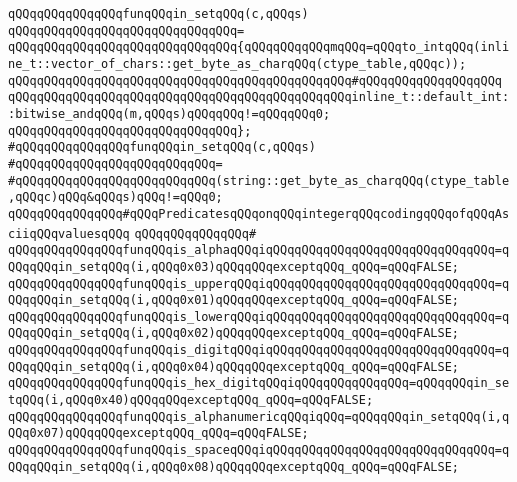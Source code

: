 \newline
\verb|qQQqqQQqqQQqqQQqfunqQQqin_setqQQq(c,qQQqs)|\newline
\verb|qQQqqQQqqQQqqQQqqQQqqQQqqQQqqQQq=|\newline
\verb|qQQqqQQqqQQqqQQqqQQqqQQqqQQqqQQq{qQQqqQQqqQQqmqQQq=qQQqto_intqQQq(inline_t::vector_of_chars::get_byte_as_charqQQq(ctype_table,qQQqc));|\newline
\verb|qQQqqQQqqQQqqQQqqQQqqQQqqQQqqQQqqQQqqQQqqQQqqQQq#qQQqqQQqqQQqqQQqqQQq|\newline
\verb|qQQqqQQqqQQqqQQqqQQqqQQqqQQqqQQqqQQqqQQqqQQqqQQqinline_t::default_int::bitwise_andqQQq(m,qQQqs)qQQqqQQq!=qQQqqQQq0;|\newline
\verb|qQQqqQQqqQQqqQQqqQQqqQQqqQQqqQQq};|\newline
\newline
\verb|#qQQqqQQqqQQqqQQqfunqQQqin_setqQQq(c,qQQqs)|\newline
\verb|#qQQqqQQqqQQqqQQqqQQqqQQqqQQq=|\newline
\verb|#qQQqqQQqqQQqqQQqqQQqqQQqqQQq(string::get_byte_as_charqQQq(ctype_table,qQQqc)qQQq&qQQqs)qQQq!=qQQq0;|\newline
\newline
\verb|qQQqqQQqqQQqqQQq#qQQqPredicatesqQQqonqQQqintegerqQQqcodingqQQqofqQQqAsciiqQQqvaluesqQQq|\newline
\verb|qQQqqQQqqQQqqQQq#|\newline
\verb|qQQqqQQqqQQqqQQqfunqQQqis_alphaqQQqiqQQqqQQqqQQqqQQqqQQqqQQqqQQqqQQq=qQQqqQQqin_setqQQq(i,qQQq0x03)qQQqqQQqexceptqQQq_qQQq=qQQqFALSE;|\newline
\verb|qQQqqQQqqQQqqQQqfunqQQqis_upperqQQqiqQQqqQQqqQQqqQQqqQQqqQQqqQQqqQQq=qQQqqQQqin_setqQQq(i,qQQq0x01)qQQqqQQqexceptqQQq_qQQq=qQQqFALSE;|\newline
\verb|qQQqqQQqqQQqqQQqfunqQQqis_lowerqQQqiqQQqqQQqqQQqqQQqqQQqqQQqqQQqqQQq=qQQqqQQqin_setqQQq(i,qQQq0x02)qQQqqQQqexceptqQQq_qQQq=qQQqFALSE;|\newline
\verb|qQQqqQQqqQQqqQQqfunqQQqis_digitqQQqiqQQqqQQqqQQqqQQqqQQqqQQqqQQqqQQq=qQQqqQQqin_setqQQq(i,qQQq0x04)qQQqqQQqexceptqQQq_qQQq=qQQqFALSE;|\newline
\verb|qQQqqQQqqQQqqQQqfunqQQqis_hex_digitqQQqiqQQqqQQqqQQqqQQq=qQQqqQQqin_setqQQq(i,qQQq0x40)qQQqqQQqexceptqQQq_qQQq=qQQqFALSE;|\newline
\verb|qQQqqQQqqQQqqQQqfunqQQqis_alphanumericqQQqiqQQq=qQQqqQQqin_setqQQq(i,qQQq0x07)qQQqqQQqexceptqQQq_qQQq=qQQqFALSE;|\newline
\verb|qQQqqQQqqQQqqQQqfunqQQqis_spaceqQQqiqQQqqQQqqQQqqQQqqQQqqQQqqQQqqQQq=qQQqqQQqin_setqQQq(i,qQQq0x08)qQQqqQQqexceptqQQq_qQQq=qQQqFALSE;|\newline
